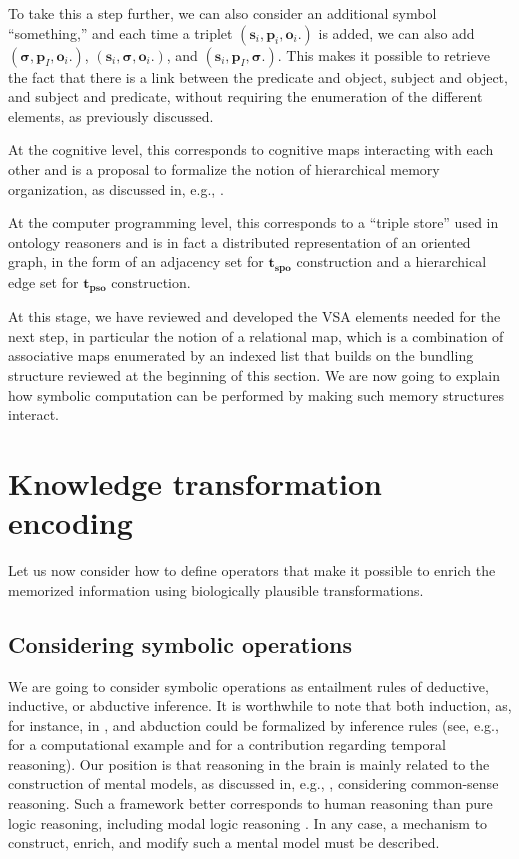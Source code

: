 \documentclass[sn-mathphys]{sn-jnl}
\begin{document}
To take this a step further, we can also consider an additional symbol ``something,'' and each time a triplet $(\mathbf{s}_i,  \mathbf{p}_i,  \mathbf{o}_i.)$ is added, we can also add $(\mathbf{\sigma},  \mathbf{p}_I,  \mathbf{o}_i.)$, $(\mathbf{s}_i,  \mathbf{\sigma},  \mathbf{o}_i.)$, and $(\mathbf{s}_i,  \mathbf{p}_I,  \mathbf{\sigma}.)$. This makes it possible to retrieve the fact that there is a link between the predicate and object, subject and object, and subject and predicate, without requiring the enumeration of the different elements, as previously discussed.

At the cognitive level, this corresponds to cognitive maps interacting with each other and is a proposal to formalize the notion of hierarchical memory organization, as discussed in, e.g., \cite{eichenbaum_memory_2017}.

At the computer programming level, this corresponds to a ``triple store'' used in ontology reasoners and is in fact a distributed representation of an oriented graph, in the form of an adjacency set for $\mathbf{t}_{\mathbf{spo}}$ construction and a hierarchical edge set for $\mathbf{t}_{\mathbf{pso}}$ construction.

At this stage, we have reviewed and developed the VSA elements needed for the next step, in particular the notion of a relational map, which is a combination of associative maps enumerated by an indexed list that builds on the bundling structure reviewed at the beginning of this section. We are now going to explain how symbolic computation can be performed by making such memory structures interact.

\section{Knowledge transformation encoding} \label{transformation}

Let us now consider how to define operators that make it possible to enrich the memorized information using biologically plausible transformations.

\subsection{Considering symbolic operations}

We are going to consider symbolic operations as entailment rules of deductive, inductive, or abductive inference. It is worthwhile to note that both induction, as, for instance, in \cite{domingos_unifying_1996}, and abduction could be formalized by inference rules (see, e.g., \cite{lakkaraju_rule_2000} for a computational example and \cite{shanahan_abductive_2000} for a contribution regarding temporal reasoning). Our position is that reasoning in the brain is mainly related to the construction of mental models, as discussed in, e.g., \cite{khemlani_causal_2014}, considering common-sense reasoning. Such a framework better corresponds to human reasoning than pure logic reasoning, including modal logic reasoning \cite{ragni_reasoning_2018}. In any case, a mechanism to construct, enrich, and modify such a mental model must be described.
\end{document}
